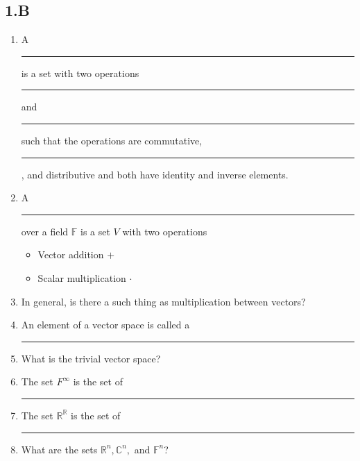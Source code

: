 \documentclass[11pt]{article}
\begin{document}
\subsection*{1.B}
\begin{enumerate}
	\item A \rule[0ex]{1in}{0.5pt} is a set with two operations \rule[0ex]{2in}{0.5pt} and \rule[0ex]{2in}{0.5pt} such that the operations are commutative, \rule[-0ex]{2in}{0.5pt}, and distributive and both have identity and inverse elements.
	\item A \rule[0ex]{2in}{0.5pt} over a field $\mathbb{F}$ is a set $V$ with two operations
		\begin{itemize}
			\item Vector addition $+$
			\item Scalar multiplication $\cdot$
		\end{itemize}
	\item In general, is there a such thing as multiplication between vectors?
	\item An element of a vector space is called a \rule[0ex]{1in}{0.5pt}
	\item What is the trivial vector space?
	\item The set $F^{\infty}$ is the set of \rule[0ex]{1.5in}{0.5pt}
	\item The set $\mathbb{R}^{\mathbb{R}}$ is the set of \rule[0ex]{2in}{0.5pt}
	\item What are the sets $\mathbb{R}^n, \mathbb{C}^n,$ and $\mathbb{F}^n$?
\end{enumerate}
\end{document}
